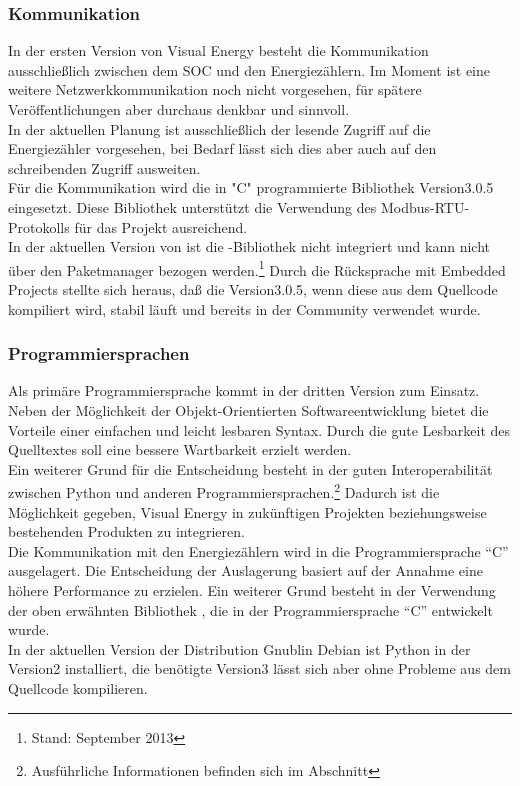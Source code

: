 \documentclass[Bachelorarbeit.tex]{subfiles}
\begin{document}
\subsubsection*{Kommunikation}
In der ersten Version von Visual Energy besteht die Kommunikation ausschließlich 
zwischen dem \ac{SOC} und den Energiezählern. 
Im Moment ist eine weitere Netzwerkkommunikation noch nicht vorgesehen, für spätere Veröffentlichungen aber durchaus denkbar und sinnvoll.\\
In der aktuellen Planung ist ausschließlich der lesende Zugriff auf die Energiezähler vorgesehen, bei Bedarf lässt sich dies aber auch auf den schreibenden Zugriff ausweiten.\\
Für die Kommunikation wird die in "C" programmierte Bibliothek  Version3.0.5 eingesetzt. 
Diese Bibliothek unterstützt die Verwendung des Modbus-RTU-Protokolls für 
das Projekt ausreichend. \\
In der aktuellen Version von  ist die -Bibliothek nicht integriert und kann nicht über den Paketmanager bezogen werden.\footnote{Stand: September 2013} Durch die Rücksprache mit Embedded Projects
stellte sich heraus, daß die  Version3.0.5, wenn diese aus dem Quellcode kompiliert wird, stabil läuft und bereits in der Community verwendet wurde.

\subsubsection*{Programmiersprachen}
Als primäre Programmiersprache kommt  in der dritten 
Version zum Einsatz. Neben der Möglichkeit der Objekt-Orientierten Softwareentwicklung 
bietet  die Vorteile einer einfachen und leicht lesbaren Syntax. Durch die gute 
Lesbarkeit des Quelltextes soll eine bessere Wartbarkeit erzielt werden. \\
Ein weiterer Grund für die Entscheidung besteht in der guten Interoperabilität zwischen 
Python und anderen Programmiersprachen.\footnote{Ausführliche Informationen befinden sich im  Abschnitt } Dadurch ist die Möglichkeit gegeben, Visual 
Energy in zukünftigen Projekten beziehungsweise bestehenden Produkten zu integrieren.\\
Die Kommunikation mit den Energiezählern wird in die Programmiersprache "`C"' ausgelagert. 
Die Entscheidung der Auslagerung basiert auf der Annahme eine höhere Performance zu erzielen. 
Ein weiterer Grund besteht in der Verwendung der oben 
erwähnten Bibliothek , die in der Programmiersprache "`C"' entwickelt wurde.\\
In der aktuellen Version der Distribution Gnublin Debian ist Python in der Version2 installiert, die benötigte Version3 lässt sich aber ohne Probleme aus dem Quellcode kompilieren.
\end{document}
